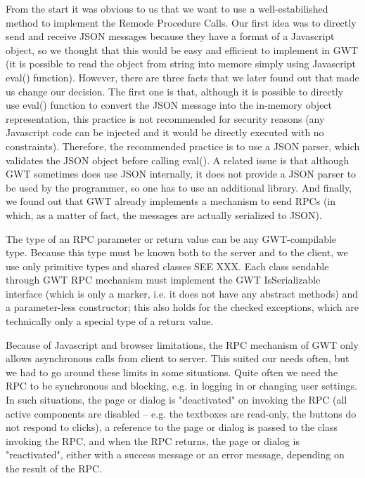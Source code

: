 From the start it was obvious to us that we want to use a well-estabilished method to implement the Remode Procedure Calls. Our first idea was to directly send and receive JSON messages because they have a format of a Javascript object, so we thought that this would be easy and efficient to implement in GWT (it is possible to read the object from string into memore simply using Javascript eval() function). However, there are three facts that we later found out that made us change our decision. The first one is that, although it is possible to directly use eval() function to convert the JSON message into the in-memory object representation, this practice is not recommended for security reasons (any Javascript code can be injected and it would be directly executed with no constraints). Therefore, the recommended practice is to use a JSON parser, which validates the JSON object before calling eval(). A related issue is that although GWT sometimes does use JSON internally, it does not provide a JSON parser to be used by the programmer, so one has to use an additional library. And finally, we found out that GWT already implements a mechanism to send RPCs (in which, as a matter of fact, the messages are actually serialized to JSON).

The type of an RPC parameter or return value can be any GWT-compilable type. Because this type must be known both to the server and to the client, we use only primitive types and shared classes SEE XXX. Each class sendable through GWT RPC mechanism must implement the GWT IsSerializable interface (which is only a marker, i.e. it does not have any abstract methods) and a parameter-less constructor; this also holds for the checked exceptions, which are technically only a special type of a return value.

Because of Javascript and browser limitations, the RPC mechanism of GWT only allows asynchronous calls from client to server. This suited our needs often, but we had to go around these limits in some situations. Quite often we need the RPC to be synchronous and blocking, e.g. in logging in or changing user settings. In such situations, the page or dialog is "deactivated" on invoking the RPC (all active components are disabled -- e.g. the textboxes are read-only, the buttons do not respond to clicks), a reference to the page or dialog is passed to the class invoking the RPC, and when the RPC returns, the page or dialog is "reactivated", either with a success message or an error message, depending on the result of the RPC.

